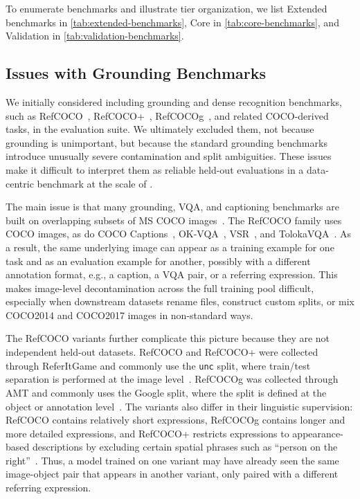 To enumerate benchmarks and illustrate tier organization, we list Extended benchmarks in \cref{tab:extended-benchmarks}, Core in \cref{tab:core-benchmarks}, and Validation in \cref{tab:validation-benchmarks}.




\subsection{Issues with Grounding Benchmarks}
\label{app:grounding-detection-issues}

We initially considered including grounding and dense recognition benchmarks, such as
RefCOCO~\citep{kazemzadeh2014referitgame}, RefCOCO+~\citep{yu2016modeling},
RefCOCOg~\citep{nagaraja2016modeling}, and related COCO-derived tasks, in the
\dcvlm evaluation suite.
We ultimately excluded them, not because grounding is unimportant, but because the
standard grounding benchmarks introduce unusually severe contamination and split
ambiguities. These issues make it difficult to interpret them as reliable held-out
evaluations in a data-centric benchmark at the scale of \dcvlm.

The main issue is that many grounding, VQA, and captioning benchmarks are built on
overlapping subsets of MS COCO images~\citep{lin2014microsoft}. The RefCOCO family
uses COCO images, as do COCO Captions~\citep{chen2015cococaptions,karpathy2015deep},
OK-VQA~\citep{marino2019okvqa}, VSR~\citep{liu2023vsr}, and
TolokaVQA~\citep{ustalov2023tolokavqa}. As a result, the same underlying image can
appear as a training example for one task and as an evaluation example for another,
possibly with a different annotation format, e.g., a caption, a VQA pair, or a
referring expression. This makes image-level decontamination across the full training
pool difficult, especially when downstream datasets rename files, construct custom
splits, or mix COCO2014 and COCO2017 images in non-standard ways.

The RefCOCO variants further complicate this picture because they are not independent
held-out datasets. RefCOCO and RefCOCO+ were collected through ReferItGame and
commonly use the \texttt{unc} split, where train/test separation is performed at the
image level~\citep{kazemzadeh2014referitgame,yu2016modeling}. RefCOCOg was collected
through AMT and commonly uses the Google split, where the split is defined at the
object or annotation level~\citep{nagaraja2016modeling}. The variants also differ in
their linguistic supervision: RefCOCO contains relatively short expressions, RefCOCOg
contains longer and more detailed expressions, and RefCOCO+ restricts expressions to
appearance-based descriptions by excluding certain spatial phrases such as ``person on
the right''~\citep{yu2016modeling,nagaraja2016modeling}. Thus, a model trained on one
variant may have already seen the same image-object pair that appears in another
variant, only paired with a different referring expression.

